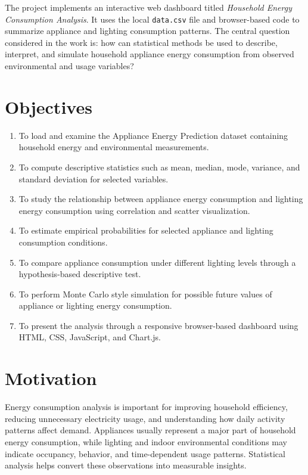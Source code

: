 \documentclass[12pt,a4paper]{article}
\begin{document}
The project implements an interactive web dashboard titled \textit{Household Energy Consumption Analysis}. It uses the local \texttt{data.csv} file and browser-based code to summarize appliance and lighting consumption patterns. The central question considered in the work is: how can statistical methods be used to describe, interpret, and simulate household appliance energy consumption from observed environmental and usage variables?

\section{Objectives}
\label{sec:objective}

\begin{enumerate}
\item To load and examine the Appliance Energy Prediction dataset containing household energy and environmental measurements.
\item To compute descriptive statistics such as mean, median, mode, variance, and standard deviation for selected variables.
\item To study the relationship between appliance energy consumption and lighting energy consumption using correlation and scatter visualization.
\item To estimate empirical probabilities for selected appliance and lighting consumption conditions.
\item To compare appliance consumption under different lighting levels through a hypothesis-based descriptive test.
\item To perform Monte Carlo style simulation for possible future values of appliance or lighting energy consumption.
\item To present the analysis through a responsive browser-based dashboard using HTML, CSS, JavaScript, and Chart.js.
\end{enumerate}




\section{Motivation}
\label{sec:motivation}

Energy consumption analysis is important for improving household efficiency, reducing unnecessary electricity usage, and understanding how daily activity patterns affect demand. Appliances usually represent a major part of household energy consumption, while lighting and indoor environmental conditions may indicate occupancy, behavior, and time-dependent usage patterns. Statistical analysis helps convert these observations into measurable insights.
\end{document}
